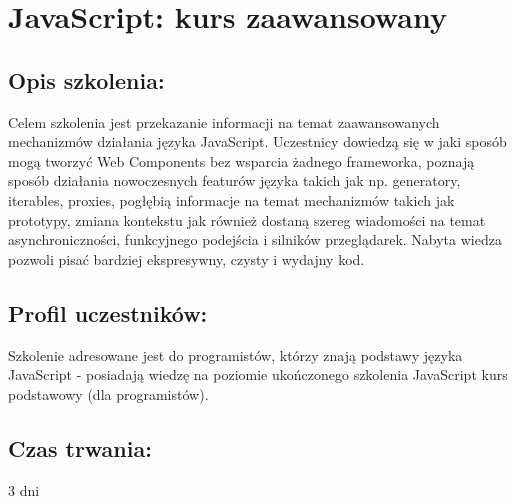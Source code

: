 \documentclass{article}[10pt]
\begin{document}
\newpage


    
	\section{JavaScript: kurs zaawansowany}

	\subsection*{Opis szkolenia:}
	\begin{adjustwidth}{2cm}{}
\justifying
		
Celem szkolenia jest przekazanie informacji na temat zaawansowanych mechanizmów działania języka JavaScript. Uczestnicy dowiedzą się w jaki sposób mogą tworzyć Web Components bez wsparcia żadnego frameworka, poznają sposób działania nowoczesnych featurów języka takich jak np. generatory, iterables, proxies, pogłębią informacje na temat mechanizmów takich jak prototypy, zmiana kontekstu jak również dostaną szereg wiadomości na temat asynchroniczności, funkcyjnego podejścia i silników przeglądarek. Nabyta wiedza pozwoli pisać bardziej ekspresywny, czysty i wydajny kod.
	\end{adjustwidth}
	\subsection*{Profil uczestników:}
\begin{adjustwidth}{2cm}{}
\justifying
	
Szkolenie adresowane jest do programistów, którzy znają podstawy języka JavaScript  - posiadają wiedzę na poziomie ukończonego szkolenia JavaScript kurs podstawowy (dla programistów).
\end{adjustwidth}
	\subsection*{Czas trwania:}
\begin{adjustwidth}{2cm}{}
	3 dni
\end{adjustwidth}
\end{document}
